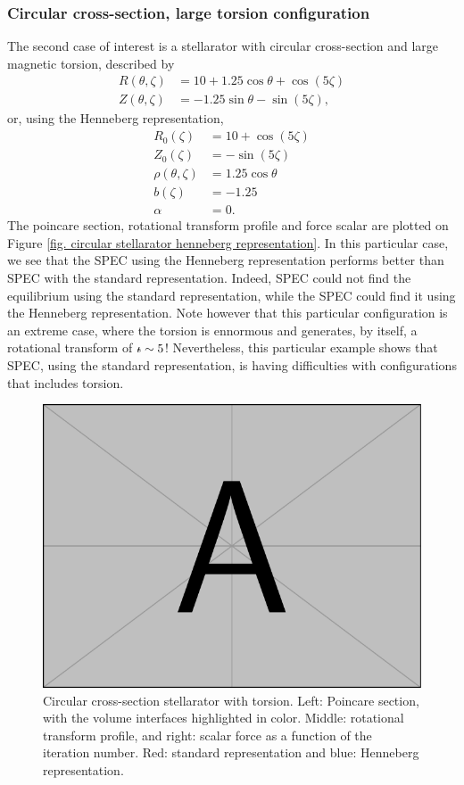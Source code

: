 \documentclass[my_thesis.tex]{subfiles}
\begin{document}
\subsubsection{Circular cross-section, large torsion configuration}
The second case of interest is a stellarator with circular cross-section and large magnetic torsion, described by
\begin{align}
	R(\theta,\zeta) &= 10 + 1.25\cos\theta + \cos(5\zeta)\\
	Z(\theta,\zeta) &= -1.25\sin\theta - \sin(5\zeta), 
\end{align}
or, using the Henneberg representation,
\begin{align}
    R_0(\zeta) &= 10 + \cos(5\zeta)\\
	Z_0(\zeta) &= -\sin(5\zeta)\\
	\rho(\theta,\zeta) &= 1.25\cos\theta\\
	b(\zeta) &= -1.25\\
	\alpha &= 0.
\end{align}
The poincare section, rotational transform profile and force scalar are plotted on Figure \ref{fig. circular stellarator henneberg representation}. In this particular case, we see that the SPEC using the Henneberg representation performs better than SPEC with the standard representation. Indeed, SPEC could not find the equilibrium using the standard representation, while the SPEC could find it using the Henneberg representation. Note however that this particular configuration is an extreme case, where the torsion is ennormous and generates, by itself, a rotational transform of $\text{$\iota\!\!$-}\sim 5$! Nevertheless, this particular example shows that SPEC, using the standard representation, is having difficulties with configurations that includes torsion. 

\begin{figure}
	\centering
	\includegraphics[width=\linewidth]{images/example-image-a.pdf}
	\caption{Circular cross-section stellarator with torsion. Left: Poincare section, with the volume interfaces highlighted in color. Middle: rotational transform profile, and right: scalar force as a function of the iteration number. Red: standard representation and blue: Henneberg representation.}
	\label{fig. circular stellarator henneberg represensation}
\end{figure}
\end{document}
